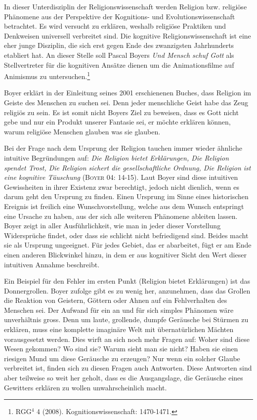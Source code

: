 In dieser Unterdisziplin der Religionswissenschaft werden Religion bzw. religiöse Phänomene aus der Perspektive der Kognitions- und Evolutionswissenschaft betrachtet. Es wird versucht zu erklären, weshalb religiöse Praktiken und Denkweisen universell verbreitet sind. Die kognitive Religionswissenschaft ist eine eher junge Disziplin, die sich erst gegen Ende des zwanzigsten Jahrhunderts etabliert hat. An dieser Stelle soll Pascal Boyers \emph{Und Mensch schuf Gott} als Stellvertreter für die kognitiven Ansätze dienen um die Animationsfilme auf Animismus zu untersuchen.\footnote{RGG$^4$ 4 (2008). Kognitionswissenschaft: 1470-1471.}

Boyer erklärt in der Einleitung seines 2001 erschienenen Buches, dass Religion im Geiste des Menschen zu suchen sei. Denn jeder menschliche Geist habe das Zeug religiös zu sein. Es ist somit nicht Boyers Ziel zu beweisen, dass es Gott nicht gebe und nur ein Produkt unserer Fantasie sei, er möchte erklären können, warum religiöse Menschen glauben was sie glauben.

Bei der Frage nach dem Ursprung der Religion tauchen immer wieder ähnliche intuitive Begründungen auf: \emph{Die Religion bietet Erklärungen, Die Religion spendet Trost, Die Religion sichert die gesellschaftliche Ordnung, Die Religion ist eine kognitive Täuschung} (\textsc{Boyer 04: 14-15}). Laut Boyer sind diese intuitiven Gewissheiten in ihrer Existenz zwar berechtigt, jedoch nicht dienlich, wenn es darum geht den Ursprung zu finden. Einen Ursprung im Sinne eines historischen Ereignis ist freilich eine Wunschvorstellung, welche aus dem Wunsch entspringt eine Ursache zu haben, aus der sich alle weiteren Phänomene ableiten lassen. Boyer zeigt in aller Ausführlichkeit, wie man in jeder dieser Vorstellung Widersprüche findet, oder dass sie schlicht nicht befriedigend sind. Beides macht sie als Ursprung ungeeignet. Für jedes Gebiet, das er abarbeitet, fügt er am Ende einen anderen Blickwinkel hinzu, in dem er aus kognitiver Sicht den Wert dieser intuitiven Annahme beschreibt.

Ein Beispiel für den Fehler im ersten Punkt (Religion bietet Erklärungen) ist das Donnergrollen. Boyer zufolge gibt es zu wenig her, anzunehmen, dass das Grollen die Reaktion von Geistern, Göttern oder Ahnen auf ein Fehlverhalten des Menschen sei. Der Aufwand für ein an und für sich simples Phänomen wäre unverhältnis gross. Denn um laute, grollende, dumpfe Geräusche bei Stürmen zu erklären, muss eine komplette imaginäre Welt mit übernatürlichen Mächten vorausgesetzt werden. Dies wirft an sich noch mehr Fragen auf: Woher sind diese Wesen gekommen? Wo sind sie? Warum sieht man sie nicht? Haben sie einen riesigen Mund um diese Geräusche zu erzeugen? Nur wenn ein solcher Glaube verbreitet ist, finden sich zu diesen Fragen auch Antworten. Diese Antworten sind aber teilweise so weit her geholt, dass es die Ausgangslage, die Geräusche eines Gewitters erklären zu wollen unwahrscheinlich macht. 

